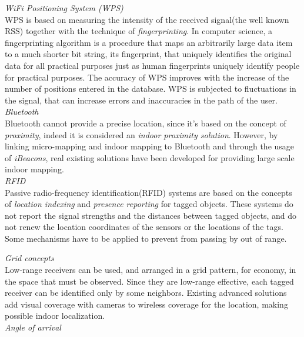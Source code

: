 \textit{WiFi Positioning System (WPS)}
\\

WPS is based on measuring the intensity of the received signal(the well known RSS) together with the technique of \textit{fingerprinting}.
In computer science, a fingerprinting algorithm is a procedure that maps an arbitrarily large data item to a much shorter bit string, its fingerprint, that uniquely identifies the original data for all practical purposes just as human fingerprints uniquely identify people for practical purposes.
The accuracy of WPS improves with the increase of the number of positions entered in the database.
WPS is subjected to fluctuations in the signal, that can increase errors and inaccuracies in the path of the user.
\\

\textit{Bluetooth}
\\

Bluetooth cannot provide a precise location, since it's based on the concept of \textit{proximity}, indeed it is considered an \textit{indoor proximity solution}.
However, by linking micro-mapping and indoor mapping to Bluetooth and through the usage of \textit{iBeacons}, real existing solutions have been developed for providing large scale indoor mapping.
\\

\textit{RFID}
\\

Passive radio-frequency identification(RFID) systems are based on the concepts of \textit{location indexing} and \textit{presence reporting} for tagged objects.
These systems do not report the signal strengths and the distances between tagged objects, and do not renew the location coordinates of the sensors or the locations of the tags.
Some mechanisms have to be applied to prevent from passing by out of range.

\newpage

\textit{Grid concepts}
\\

Low-range receivers can be used, and arranged in a grid pattern, for economy, in the space that must be observed.
Since they are low-range effective, each tagged receiver can be identified only by some neighbors.
Existing advanced solutions add visual coverage with cameras to wireless coverage for the location, making possible indoor localization.
\\

\textit{Angle of arrival}
\\

